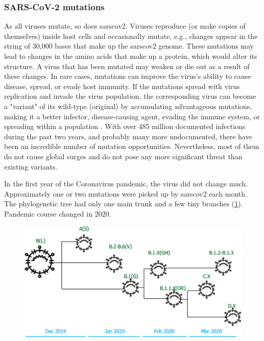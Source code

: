         \subsubsection{SARS-CoV-2 mutations}
        As all viruses mutate, so does \acrshort{sarscov2}. Viruses reproduce (or make copies of themselves) inside host cells and occasionally mutate, e.g., changes appear in the string of 30,000 bases that make up the \acrshort{sarscov2} genome. These mutations may lead to changes in the amino acids that make up a protein, which would alter its structure. A virus that has been mutated may weaken or die out as a result of these changes. In rare cases, mutations can improve the virus's ability to cause disease, spread, or evade host immunity. If the mutations spread with virus replication and invade the virus population, the corresponding virus can become a "variant" of its wild-type (original) by accumulating advantageous mutations, making it a better infector, disease-causing agent, evading the immune system, or spreading within a population \cite{variants}. With over 485 million documented infections during the past two years, and probably many more undocumented, there have been an incredible number of mutation opportunities.  Nevertheless, most of them do not cause global surges and do not pose any more significant threat than existing variants.
        
        In the first year of the Coronavirus pandemic, the virus did not change much. Approximately one or two mutations were picked up by \acrshort{sarscov2} each month. The phylogenetic tree had only one main trunk and a few tiny branches (\cref{fig:intro:corona-timeline}). Pandemic course changed in 2020.
        \begin{figure}[h]
        	\centering
        	\includegraphics[width=1\textwidth]{figures/intro/corona-timeline.png}
        	\label{fig:intro:corona-timeline}
        \end{figure}
